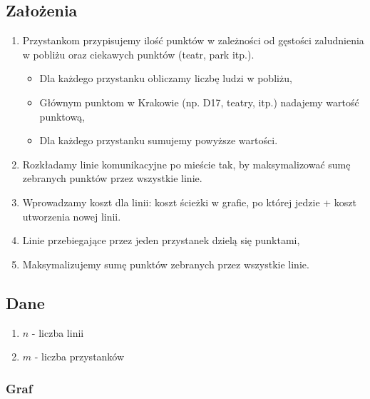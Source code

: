\documentclass[12pt,a4paper,openright]{mwrep}
\begin{document}
\subsection{Założenia}

\begin{enumerate}
    \item Przystankom przypisujemy ilość punktów w zależności od gęstości zaludnienia w pobliżu oraz ciekawych punktów (teatr, park itp.).
          \begin{itemize}
              \item Dla każdego przystanku obliczamy liczbę ludzi w pobliżu,
              \item Głównym punktom w Krakowie (np. D17, teatry, itp.) nadajemy wartość punktową,
              \item Dla każdego przystanku sumujemy powyższe wartości.
          \end{itemize}
    \item Rozkładamy linie komunikacyjne po mieście tak, by maksymalizować sumę zebranych punktów przez wszystkie linie.
    \item Wprowadzamy koszt dla linii: koszt ścieżki w grafie, po której jedzie + koszt utworzenia nowej linii.
    \item Linie przebiegające przez jeden przystanek dzielą się punktami,
    \item Maksymalizujemy sumę punktów zebranych przez wszystkie linie.
\end{enumerate}

\subsection{Dane}
\begin{enumerate}
    \item $n$ - liczba linii
    \item $m$ - liczba przystanków
\end{enumerate}

\subsubsection{Graf}
\end{document}
